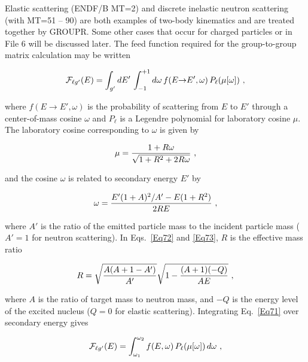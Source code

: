 Elastic scattering (ENDF/B MT=2) and discrete inelastic neutron
scattering (with MT=51 -- 90) are both examples of two-body kinematics
 and are treated together by GROUPR.  Some
other cases that occur for charged particles or in
File 6 will be discussed later.  The
feed function required for the group-to-group matrix calculation
may be written

  \begin{equation}
    {\cal F}_{\ell g'}(E)=\int_{g'}dE'\,\int_{-1}^{+1}d\omega\,
    f(E{\rightarrow}E',\omega)\,P_{\ell}(\mu[\omega])\,\,,
  \label{Eq71}
  \end{equation}

\noindent
where $f(E{\rightarrow}E',\omega)$ is the probability of scattering
from $E$ to $E'$ through a center-of-mass cosine $\omega$ and $P_{\ell}$
is a Legendre polynomial for laboratory cosine $\mu$.  The laboratory
cosine corresponding to $\omega$ is given by

  \begin{equation}
    \mu={{1+R\omega}\over
    {\sqrt{1+R^2+2R\omega }}}\,\,,
  \label{Eq72}
  \end{equation}

\noindent
and the cosine $\omega$ is related to secondary energy $E'$ by

  \begin{equation}
    \omega={{E'(1+A)^2/A'-E(1+R^2)}
    \over{2RE}}\,\,,
  \label{Eq73}
  \end{equation}

\noindent
where $A'$ is the ratio of the emitted particle mass to the incident
particle mass ($A'{=}1$ for neutron scattering).  In Eqs.~\ref{Eq72}
and \ref{Eq73}, $R$ is the effective mass ratio

  \begin{equation}
    R=\sqrt{\frac{A(A+1-A')}{A'}}\sqrt{1-{{(A+1)(-Q)}\over{AE}} }\,\,,
  \label{Eq74}
  \end{equation}

\noindent
where $A$ is the ratio of target mass to neutron mass, and $-Q$ is the
energy level of the excited nucleus ($Q{=}0$ for elastic scattering).
Integrating Eq.~\ref{Eq71} over secondary energy gives

  \begin{equation}
    {\cal F}_{\ell g'}(E)=\int_{\omega_1}^{\omega_2}
    f(E,\omega)\,P_{\ell}(\mu[\omega])\,d\omega\,\,,
  \label{Eq75}
  \end{equation}

